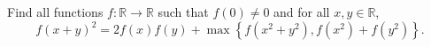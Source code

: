Find all functions 
$f:\mathbb{R}\rightarrow\mathbb{R}$
 such that 
$f(0)\neq 0$
 and for all 
$x,y\in\mathbb{R}$, 
\[ f(x+y)^2 = 2f(x)f(y) + \max \left\{ f(x^2+y^2), f(x^2)+f(y^2) \right\}. \]
